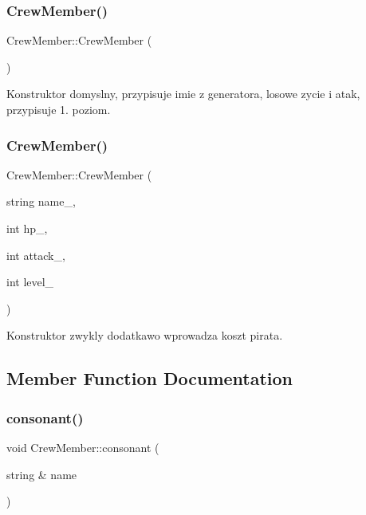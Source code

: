 \subsubsection{\texorpdfstring{Crew\+Member()}{CrewMember()}\hspace{0.1cm}{\footnotesize\ttfamily [1/2]}}
{\footnotesize\ttfamily Crew\+Member\+::\+Crew\+Member (\begin{DoxyParamCaption}{ }\end{DoxyParamCaption})\hspace{0.3cm}{\ttfamily [inline]}}



Konstruktor domyslny, przypisuje imie z generatora, losowe zycie i atak, przypisuje 1. poziom. 

\mbox{\label{class_crew_member_a93f235bcda7aabc4e97673e446fc17ea}} 
\subsubsection{\texorpdfstring{Crew\+Member()}{CrewMember()}\hspace{0.1cm}{\footnotesize\ttfamily [2/2]}}
{\footnotesize\ttfamily Crew\+Member\+::\+Crew\+Member (\begin{DoxyParamCaption}\item[{string}]{name\+\_\+,  }\item[{int}]{hp\+\_\+,  }\item[{int}]{attack\+\_\+,  }\item[{int}]{level\+\_\+ }\end{DoxyParamCaption})\hspace{0.3cm}{\ttfamily [inline]}}



Konstruktor zwykly dodatkawo wprowadza koszt pirata. 



\subsection{Member Function Documentation}
\mbox{\label{class_crew_member_a822fee67c0e8a9416bc208824d966961}} 
\subsubsection{\texorpdfstring{consonant()}{consonant()}}
{\footnotesize\ttfamily void Crew\+Member\+::consonant (\begin{DoxyParamCaption}\item[{string \&}]{name }\end{DoxyParamCaption})}



